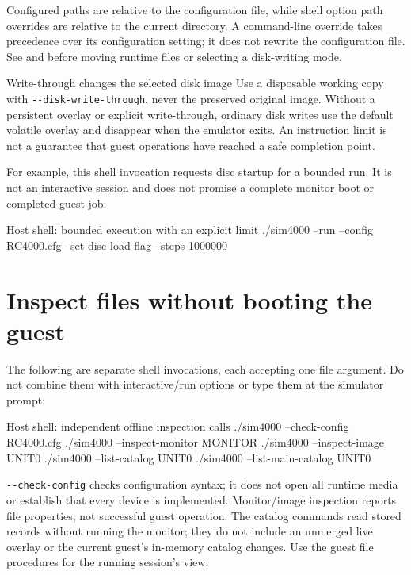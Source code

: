 Configured paths are relative to the configuration file, while shell option path overrides are relative to the current directory. A command-line override takes precedence over its configuration setting; it does not rewrite the configuration file. See  and  before moving runtime files or selecting a disk-writing mode.

\begin{operationnote}{Write-through changes the selected disk image}
Use a disposable working copy with \passthrough{\lstinline!--disk-write-through!}, never the preserved original image. Without a persistent overlay or explicit write-through, ordinary disk writes use the default volatile overlay and disappear when the emulator exits. An instruction limit is not a guarantee that guest operations have reached a safe completion point.
\end{operationnote}

For example, this shell invocation requests disc startup for a bounded run. It is not an interactive session and does not promise a complete monitor boot or completed guest job:

\begin{commandexample}[language=sh]{Host shell: bounded execution with an explicit limit}
./sim4000 --run --config RC4000.cfg --set-disc-load-flag --steps 1000000
\end{commandexample}

\section{Inspect files without booting the guest}\label{inspect-files-without-booting-the-guest}

The following are separate shell invocations, each accepting one file argument. Do not combine them with interactive/run options or type them at the simulator prompt:

\begin{commandexample}[language=sh]{Host shell: independent offline inspection calls}
./sim4000 --check-config RC4000.cfg
./sim4000 --inspect-monitor MONITOR
./sim4000 --inspect-image UNIT0
./sim4000 --list-catalog UNIT0
./sim4000 --list-main-catalog UNIT0
\end{commandexample}

\passthrough{\lstinline!--check-config!} checks configuration syntax; it does not open all runtime media or establish that every device is implemented. Monitor/image inspection reports file properties, not successful guest operation. The catalog commands read stored records without running the monitor; they do not include an unmerged live overlay or the current guest's in-memory catalog changes. Use the guest file procedures for the running session's view.

